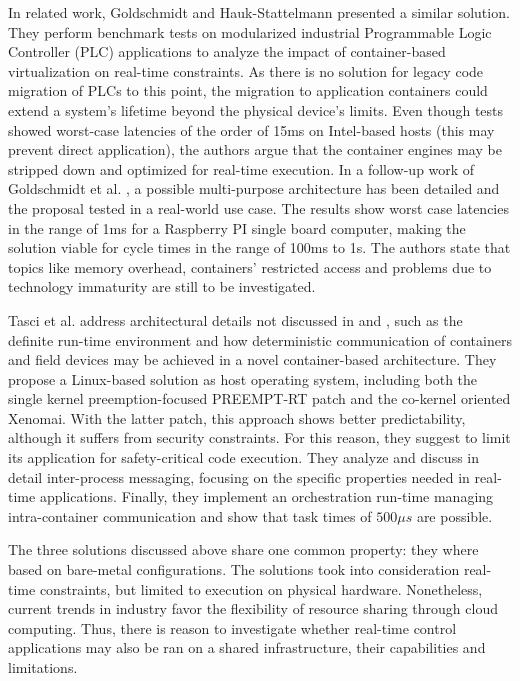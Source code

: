 \documentclass[]{scrartcl}
\begin{document}
In related work, Goldschmidt and Hauk-Stattelmann \cite{GoldschmidtHauck-Stattelmann2016} presented a similar solution.
They perform benchmark tests on modularized industrial Programmable Logic Controller (PLC) applications to analyze the impact of container-based virtualization on real-time constraints.
As there is no solution for legacy code migration of PLCs to this point, the migration to application containers could extend a system's lifetime beyond the physical device's limits.
Even though tests showed worst-case latencies of the order of 15ms on Intel-based hosts (this may prevent direct application), the authors argue that the container engines may be stripped down and optimized for real-time execution.
In a follow-up work of Goldschmidt et al. \cite{Goldschmidtetal2018}, a possible multi-purpose architecture has been detailed and the proposal tested in a real-world use case.
The results show worst case latencies in the range of 1ms for a Raspberry PI single board computer, making the solution viable for cycle times in the range of 100ms to 1s.
The authors state that topics like memory overhead, containers' restricted access and problems due to technology immaturity are still to be investigated.

Tasci et al. \cite{Tascietal2018} address architectural details not discussed in \cite{GoldschmidtHauck-Stattelmann2016} and \cite{Goldschmidtetal2018}, such as the definite run-time environment and how deterministic communication of containers and field devices may be achieved in a novel container-based architecture. 
They propose a Linux-based solution as host operating system, including both the single kernel preemption-focused PREEMPT-RT patch and the co-kernel oriented Xenomai. 
With the latter patch, this approach shows better predictability, although it suffers from security constraints. For this reason, they suggest to limit its application for safety-critical code execution. 
They analyze and discuss in detail inter-process messaging, focusing on the specific properties needed in real-time applications.
Finally, they implement an orchestration run-time managing intra-container communication and show that task times of $500\mu s$ are possible.

The three solutions discussed above share one common property: they where based on bare-metal configurations. 
The solutions took into consideration real-time constraints, but limited to execution on physical hardware.
Nonetheless, current trends in industry favor the flexibility of resource sharing through cloud computing.
Thus, there is reason to investigate whether real-time control applications may also be ran on a shared infrastructure, their capabilities and limitations.
\end{document}
